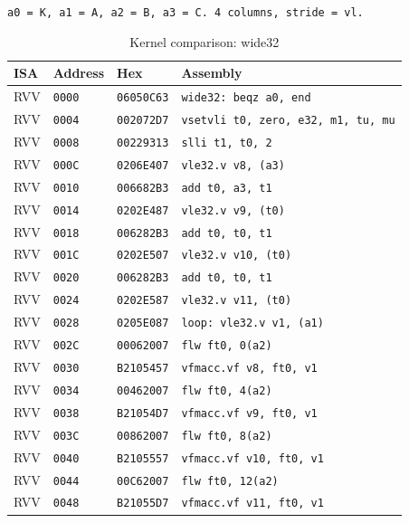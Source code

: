 \begin{table}[htbp]
\centering
\caption{Kernel comparison: wide32}
\begingroup
\scriptsize
\setlength{\tabcolsep}{4pt}
\noindent \texttt{a0 = K, a1 = A, a2 = B, a3 = C. 4 columns, stride = vl.}\par
\vspace{0.6ex}
\begin{tabular}{@{}l|l|l|p{7.2cm}@{}}
\toprule
ISA & Address & Hex & Assembly \\
\midrule
RVV & \texttt{0000} & \texttt{06050C63} & \texttt{wide32: beqz a0, end} \\
RVV & \texttt{0004} & \texttt{002072D7} & \texttt{vsetvli t0, zero, e32, m1, tu, mu} \\
RVV & \texttt{0008} & \texttt{00229313} & \texttt{slli t1, t0, 2} \\
RVV & \texttt{000C} & \texttt{0206E407} & \texttt{vle32.v v8, (a3)} \\
RVV & \texttt{0010} & \texttt{006682B3} & \texttt{add t0, a3, t1} \\
RVV & \texttt{0014} & \texttt{0202E487} & \texttt{vle32.v v9, (t0)} \\
RVV & \texttt{0018} & \texttt{006282B3} & \texttt{add t0, t0, t1} \\
RVV & \texttt{001C} & \texttt{0202E507} & \texttt{vle32.v v10, (t0)} \\
RVV & \texttt{0020} & \texttt{006282B3} & \texttt{add t0, t0, t1} \\
RVV & \texttt{0024} & \texttt{0202E587} & \texttt{vle32.v v11, (t0)} \\
RVV & \texttt{0028} & \texttt{0205E087} & \texttt{loop: vle32.v v1, (a1)} \\
RVV & \texttt{002C} & \texttt{00062007} & \texttt{flw ft0, 0(a2)} \\
RVV & \texttt{0030} & \texttt{B2105457} & \texttt{vfmacc.vf v8, ft0, v1} \\
RVV & \texttt{0034} & \texttt{00462007} & \texttt{flw ft0, 4(a2)} \\
RVV & \texttt{0038} & \texttt{B21054D7} & \texttt{vfmacc.vf v9, ft0, v1} \\
RVV & \texttt{003C} & \texttt{00862007} & \texttt{flw ft0, 8(a2)} \\
RVV & \texttt{0040} & \texttt{B2105557} & \texttt{vfmacc.vf v10, ft0, v1} \\
RVV & \texttt{0044} & \texttt{00C62007} & \texttt{flw ft0, 12(a2)} \\
RVV & \texttt{0048} & \texttt{B21055D7} & \texttt{vfmacc.vf v11, ft0, v1} \\

\end{tabular}
\end{table}
